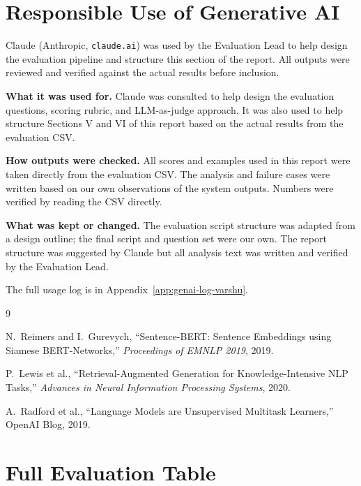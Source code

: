 \documentclass[10pt,conference]{IEEEtran}
\begin{document}
\section{Responsible Use of Generative AI}
\label{sec:genai-varshu}

Claude (Anthropic, \texttt{claude.ai}) was used by the Evaluation
Lead to help design the evaluation pipeline and structure this
section of the report. All outputs were reviewed and verified against
the actual results before inclusion.

\textbf{What it was used for.} Claude was consulted to help design
the evaluation questions, scoring rubric, and LLM-as-judge approach.
It was also used to help structure Sections V and VI of this report
based on the actual results from the evaluation CSV.

\textbf{How outputs were checked.} All scores and examples used in
this report were taken directly from the evaluation CSV. The analysis
and failure cases were written based on our own observations of the
system outputs. Numbers were verified by reading the CSV directly.

\textbf{What was kept or changed.} The evaluation script structure
was adapted from a design outline; the final script and question set
were our own. The report structure was suggested by Claude but all
analysis text was written and verified by the Evaluation Lead.

The full usage log is in Appendix~\ref{app:genai-log-varshu}.

\begin{thebibliography}{9}

N.~Reimers and I.~Gurevych,
``Sentence-BERT: Sentence Embeddings using Siamese BERT-Networks,''
\textit{Proceedings of EMNLP 2019}, 2019.

P.~Lewis et al.,
``Retrieval-Augmented Generation for Knowledge-Intensive NLP Tasks,''
\textit{Advances in Neural Information Processing Systems}, 2020.

A.~Radford et al.,
``Language Models are Unsupervised Multitask Learners,''
OpenAI Blog, 2019.

\end{thebibliography}

\appendices

\section{Full Evaluation Table}
\label{app:eval-table}
\end{document}
